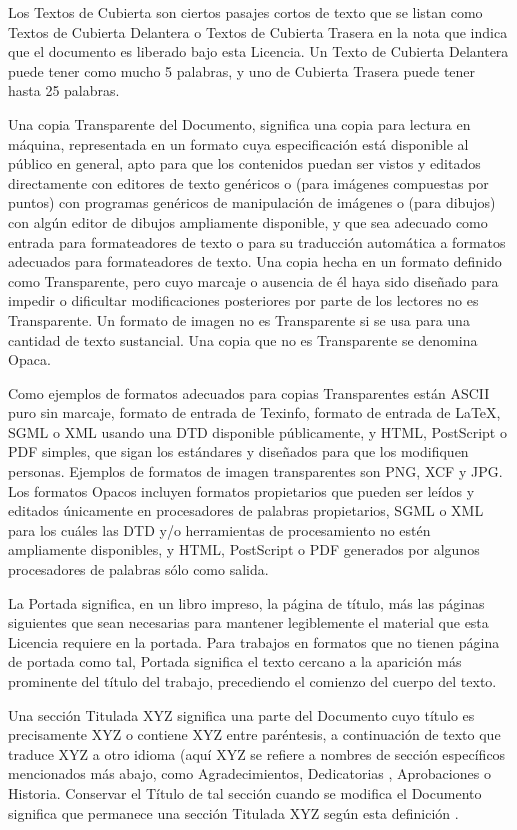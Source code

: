 Los Textos de Cubierta son ciertos pasajes cortos de texto que se
listan como Textos de Cubierta Delantera o Textos de Cubierta Trasera
en la nota que indica que el documento es liberado bajo esta Licencia.
Un Texto de Cubierta Delantera puede tener como mucho 5 palabras,
y uno de Cubierta Trasera puede tener hasta 25 palabras.

Una copia Transparente del Documento, significa una copia para lectura
en máquina, representada en un formato cuya especificación está disponible
al público en general, apto para que los contenidos puedan ser vistos
y editados directamente con editores de texto genéricos o (para imágenes
compuestas por puntos) con programas genéricos de manipulación de
imágenes o (para dibujos) con algún editor de dibujos ampliamente
disponible, y que sea adecuado como entrada para formateadores de
texto o para su traducción automática a formatos adecuados para formateadores
de texto. Una copia hecha en un formato definido como Transparente,
pero cuyo marcaje o ausencia de él haya sido diseñado para impedir
o dificultar modificaciones posteriores por parte de los lectores
no es Transparente. Un formato de imagen no es Transparente si se
usa para una cantidad de texto sustancial. Una copia que no es Transparente
se denomina Opaca.

Como ejemplos de formatos adecuados para copias Transparentes están
ASCII puro sin marcaje, formato de entrada de Texinfo, formato de
entrada de LaTeX, SGML o XML usando una DTD disponible públicamente,
y HTML, PostScript o PDF simples, que sigan los estándares y diseñados
para que los modifiquen personas. Ejemplos de formatos de imagen transparentes
son PNG, XCF y JPG. Los formatos Opacos incluyen formatos propietarios
que pueden ser leídos y editados únicamente en procesadores de palabras
propietarios, SGML o XML para los cuáles las DTD y/o herramientas
de procesamiento no estén ampliamente disponibles, y HTML, PostScript
o PDF generados por algunos procesadores de palabras sólo como salida.

La Portada significa, en un libro impreso, la página de título, más
las páginas siguientes que sean necesarias para mantener legiblemente
el material que esta Licencia requiere en la portada. Para trabajos
en formatos que no tienen página de portada como tal, Portada significa
el texto cercano a la aparición más prominente del título del trabajo,
precediendo el comienzo del cuerpo del texto.

Una sección Titulada XYZ significa una parte del Documento cuyo título
es precisamente XYZ o contiene XYZ entre paréntesis, a continuación
de texto que traduce XYZ a otro idioma (aquí XYZ se refiere a nombres
de sección específicos mencionados más abajo, como Agradecimientos,
Dedicatorias , Aprobaciones o Historia. Conservar el Título de tal
sección cuando se modifica el Documento significa que permanece una
sección Titulada XYZ según esta definición .

